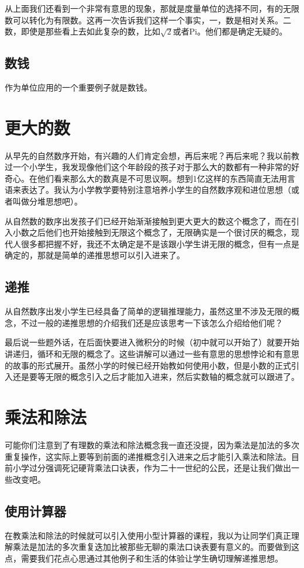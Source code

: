 \documentclass[12pt]{exam}%
\begin{document}
从上面我们还看到一个非常有意思的现象，那就是度量单位的选择不同，有的无限数可以转化为有限数。这再一次告诉我们这样一个事实，一，数是相对关系。二数，即使是那些看上去如此复杂的数，比如$\sqrt{2}$或者Pi。他们都是确定无疑的。

\subsection{数钱}
作为单位应用的一个重要例子就是数钱。

\section{更大的数}
从早先的自然数序开始，有兴趣的人们肯定会想，再后来呢？再后来呢？我以前教过一个小学生，我发现像他们这个年龄段的孩子对于那么大的数都有一种非常的好奇心。在他们看来那么大的数真是不可思议啊。想到1亿这样的东西简直无法用言语来表达了。我认为小学教学要特别注意培养小学生的自然数序观和进位思想（或者叫做分堆思想吧）。

从自然数的数序出发孩子们已经开始渐渐接触到更大更大的数这个概念了，而在引入小数之后他们也开始接触到无限这个概念了，无限确实是一个很讨厌的概念，现代人很多都把握不好，我还不太确定是不是该跟小学生讲无限的概念，但有一点是确定的，那就是简单的递推思想可以引入进来了。


\subsection{递推}
从自然数序出发小学生已经具备了简单的逻辑推理能力，虽然这里不涉及无限的概念，不过一般的递推思想的介绍我们还是应该思考一下该怎么介绍给他们呢？


最后说一些题外话，在后面快要进入微积分的时候（初中就可以开始了）就要开始讲递归，循环和无限的概念了。这些讲解可以通过一些有意思的思想悖论和有意思的故事的形式展开。虽然小学的时候已经开始教如何使用小数，但是小数的正式引入还是要等无限的概念引入之后才能加入进来，然后实数轴的概念就可以跟进了。


\section{乘法和除法}
可能你们注意到了有理数的乘法和除法概念我一直还没提，因为乘法是加法的多次重复操作，这实际上要等到前面的递推概念引入进来之后才能引入乘法和除法。目前小学过分强调死记硬背乘法口诀表，作为二十一世纪的公民，还是让我们做出一些改变吧。

\subsection{使用计算器}
在教乘法和除法的时候就可以引入使用小型计算器的课程，我以为让同学们真正理解乘法是加法的多次重复迭加比被那些无聊的乘法口诀表要有意义的。而要做到这点，需要我们花点心思通过其他例子和生活的体验让学生确切理解递推思想。
\end{document}
